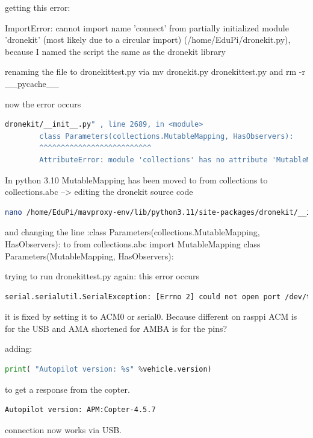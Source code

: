 \documentclass{article}
\begin{document}
	getting this error:
	
	ImportError: cannot import name 'connect' from partially initialized module 'dronekit' (most likely due to a circular import) (/home/EduPi/dronekit.py), because I named the script the same as the dronekit library
	
	renaming the file to dronekittest.py via
	mv dronekit.py dronekittest.py
	and rm -r \_\_pycache\_\_
	
	now the error occurs
	\begin{lstlisting}[caption= MutableMapping Error, language=bash]
		dronekit/__init__.py" , line 2689, in <module>
		class Parameters(collections.MutableMapping, HasObservers):
		^^^^^^^^^^^^^^^^^^^^^^^^^^
		AttributeError: module 'collections' has no attribute 'MutableMapping'
	\end{lstlisting}
	
	In python 3.10 MutableMapping has been moved to from collections to collections.abc --> editing the dronekit source code 
	
	\begin{lstlisting}[language=bash]
		nano /home/EduPi/mavproxy-env/lib/python3.11/site-packages/dronekit/__init__.py
	\end{lstlisting}
	
	and changing the line :class Parameters(collections.MutableMapping, HasObservers): 
	to 
	from collections.abc import MutableMapping
	class Parameters(MutableMapping, HasObservers):
	
	trying to run dronekittest.py again: this error occurs
	
	\begin{lstlisting}[language=bash]
		serial.serialutil.SerialException: [Errno 2] could not open port /dev/ttyAMA0: [Errno 2] No such file or directory: '/dev/ttyAMA0'
	\end{lstlisting}
	it is fixed by setting it to ACM0 or serial0. Because different on rasppi ACM is for the USB and AMA shortened for AMBA is for the pins? \cite{ttyAMA}
	
	adding:
	\begin{lstlisting}[language=python, caption={Python Dronekittest 2}]
		print( "Autopilot version: %s" %vehicle.version)
	\end{lstlisting}
	to get a response from the copter. 
	\begin{lstlisting}[language=bash]
		Autopilot version: APM:Copter-4.5.7
	\end{lstlisting}
	connection now works via USB.
	
\end{document}

